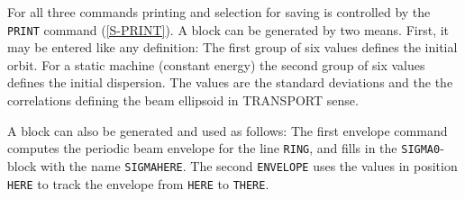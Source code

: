 For all three commands printing and selection for saving is controlled
by the {\tt PRINT} command (\ref{S-PRINT}).
A  block can be generated by two means.
First, it may be entered like any definition:
The first group of six values defines the initial orbit.
For a static machine (constant energy) the second group of six values
defines the initial dispersion.
The values  are the standard deviations and the
 the correlations defining the beam ellipsoid in
TRANSPORT sense.
\label{S_SAVSIG}
 
A  block can also be generated and used as follows:
The first envelope command computes the periodic beam envelope for the
line {\tt RING}, and fills in the {\tt SIGMA0}-block with the name
{\tt SIGMAHERE}.
The second {\tt ENVELOPE} uses the values in position {\tt HERE} to
track the envelope from {\tt HERE} to {\tt THERE}.
 
